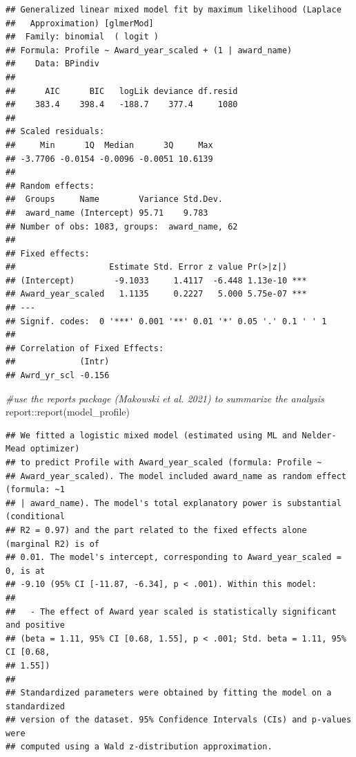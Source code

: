 \documentclass[
]{article}
\newenvironment{Shaded}{\begin{snugshade}}{\end{snugshade}}
\newcommand{\CommentTok}[1]{\textcolor[rgb]{0.56,0.35,0.01}{\textit{#1}}}
\newcommand{\FunctionTok}[1]{\textcolor[rgb]{0.00,0.00,0.00}{#1}}
\newcommand{\NormalTok}[1]{#1}
\newcommand{\SpecialCharTok}[1]{\textcolor[rgb]{0.00,0.00,0.00}{#1}}
\begin{document}
\begin{verbatim}
## Generalized linear mixed model fit by maximum likelihood (Laplace
##   Approximation) [glmerMod]
##  Family: binomial  ( logit )
## Formula: Profile ~ Award_year_scaled + (1 | award_name)
##    Data: BPindiv
## 
##      AIC      BIC   logLik deviance df.resid 
##    383.4    398.4   -188.7    377.4     1080 
## 
## Scaled residuals: 
##     Min      1Q  Median      3Q     Max 
## -3.7706 -0.0154 -0.0096 -0.0051 10.6139 
## 
## Random effects:
##  Groups     Name        Variance Std.Dev.
##  award_name (Intercept) 95.71    9.783   
## Number of obs: 1083, groups:  award_name, 62
## 
## Fixed effects:
##                   Estimate Std. Error z value Pr(>|z|)    
## (Intercept)        -9.1033     1.4117  -6.448 1.13e-10 ***
## Award_year_scaled   1.1135     0.2227   5.000 5.75e-07 ***
## ---
## Signif. codes:  0 '***' 0.001 '**' 0.01 '*' 0.05 '.' 0.1 ' ' 1
## 
## Correlation of Fixed Effects:
##             (Intr)
## Awrd_yr_scl -0.156
\end{verbatim}

\begin{Shaded}
\begin{Highlighting}[]
\CommentTok{\#use the reports package (Makowski et al. 2021) to summarize the analysis}
\NormalTok{report}\SpecialCharTok{::}\FunctionTok{report}\NormalTok{(model\_profile)}
\end{Highlighting}
\end{Shaded}

\begin{verbatim}
## We fitted a logistic mixed model (estimated using ML and Nelder-Mead optimizer)
## to predict Profile with Award_year_scaled (formula: Profile ~
## Award_year_scaled). The model included award_name as random effect (formula: ~1
## | award_name). The model's total explanatory power is substantial (conditional
## R2 = 0.97) and the part related to the fixed effects alone (marginal R2) is of
## 0.01. The model's intercept, corresponding to Award_year_scaled = 0, is at
## -9.10 (95% CI [-11.87, -6.34], p < .001). Within this model:
## 
##   - The effect of Award year scaled is statistically significant and positive
## (beta = 1.11, 95% CI [0.68, 1.55], p < .001; Std. beta = 1.11, 95% CI [0.68,
## 1.55])
## 
## Standardized parameters were obtained by fitting the model on a standardized
## version of the dataset. 95% Confidence Intervals (CIs) and p-values were
## computed using a Wald z-distribution approximation.
\end{verbatim}
\end{document}
